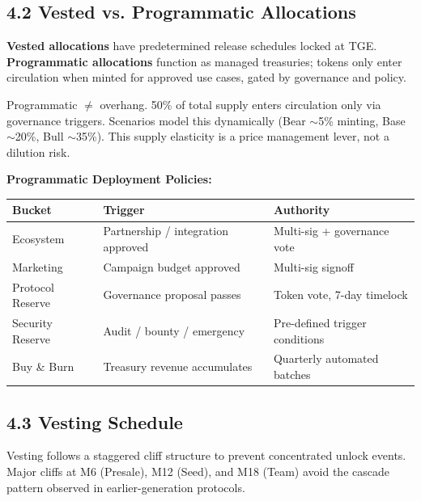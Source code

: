 \documentclass[
  paper=a4,
  ,captions=tableheading
]{scrartcl}
\begin{document}
\subsection{4.2 Vested vs. Programmatic Allocations}\label{vested-vs-programmatic}

\textbf{Vested allocations} have predetermined release schedules locked at TGE. \textbf{Programmatic allocations} function as managed treasuries; tokens only enter circulation when minted for approved use cases, gated by governance and policy.

Programmatic $\neq$ overhang. 50\% of total supply enters circulation only via governance triggers. Scenarios model this dynamically (Bear $\sim$5\% minting, Base $\sim$20\%, Bull $\sim$35\%). This supply elasticity is a price management lever, not a dilution risk.

\begin{samepage}
\textbf{Programmatic Deployment Policies:}

\begin{center}
\begin{tabular}{lll}
\toprule
\textbf{Bucket} & \textbf{Trigger} & \textbf{Authority} \\
\midrule
Ecosystem & Partnership / integration approved & Multi-sig + governance vote \\
Marketing & Campaign budget approved & Multi-sig signoff \\
Protocol Reserve & Governance proposal passes & Token vote, 7-day timelock \\
Security Reserve & Audit / bounty / emergency & Pre-defined trigger conditions \\
Buy \& Burn & Treasury revenue accumulates & Quarterly automated batches \\
\bottomrule
\end{tabular}
\end{center}
\end{samepage}

\subsection{4.3 Vesting Schedule}\label{vesting-schedule}

Vesting follows a staggered cliff structure to prevent concentrated unlock events. Major cliffs at M6 (Presale), M12 (Seed), and M18 (Team) avoid the cascade pattern observed in earlier-generation protocols.
\end{document}
